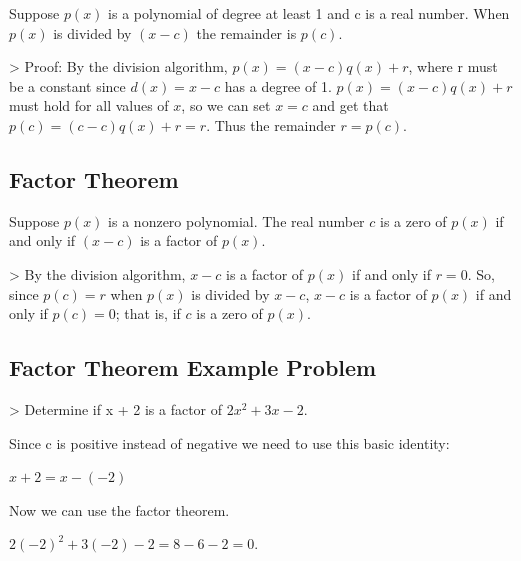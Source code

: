 Suppose $p(x)$ is a polynomial of degree at least 1 and c is a real number. When $p(x)$ is
divided by $(x - c)$ the remainder is $p(c)$.



> Proof: By the division algorithm, $p(x) = (x - c)q(x) + r$, where r must be a constant
since $d(x) = x - c$ has a degree of 1. $p(x) = (x - c)q(x) + r$ must hold for all values
of $x$, so we can set $x = c$ and get that $p(c) = (c - c)q(x) + r = r$. Thus the
remainder $r = p(c)$.




\subsection{Factor Theorem}
\label{sss:fact-8420}




Suppose $p(x)$ is a nonzero polynomial. The real number $c$ is a zero of $p(x)$ if and
only if $(x - c)$ is a factor of $p(x)$.



> By the division algorithm, $x - c$ is a factor of $p(x)$ if and only if $r = 0$. So,
since $p(c) = r$ when $p(x)$ is divided by $x - c$, $x - c$ is a factor of $p(x)$ if and
only if $p(c) = 0$; that is, if $c$ is a zero of $p(x)$.




\subsection{Factor Theorem Example Problem}
\label{sss:fact-0b0b}




> Determine if x + 2 is a factor of $2x^2 + 3x -2$.



Since c is positive instead of negative we need to use this basic identity:



$x + 2 = x - \left ( - 2 \right )$



Now we can use the factor theorem.



$2 \left (-2 \right )^2 + 3 \left (-2 \right ) -2 = 8 - 6 - 2 = 0$.



